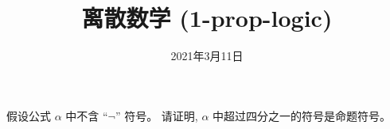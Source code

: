 \documentclass[a4paper, justified]{tufte-handout}
\title{离散数学 (1-prop-logic)}
\date{2021年3月11日}
\begin{document}
\maketitle
\noplagiarism %
\begin{abstract}
\end{abstract}
\beginrequired
\begin{problem}
  假设公式 $\alpha$ 中不含 ``$\lnot$'' 符号。
  请证明, $\alpha$ 中超过四分之一的符号是命题符号。
\end{problem}
\end{document}
